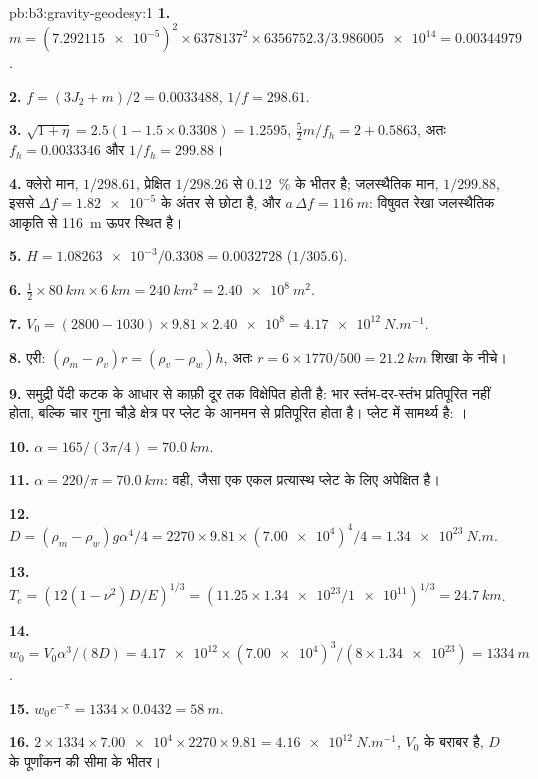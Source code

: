 \begin{solution}{pb:b3:gravity-geodesy:1}
\textbf{1.} $m = (\num{7.292115e-5})^2\times6378137^2\times6356752.3/
\num{3.986005e14} = \num{0.00344979}$.

\textbf{2.} $f = (3J_2 + m)/2 = \num{0.0033488}$, $1/f = 298.61$.

\textbf{3.} $\sqrt{1 + \eta} = 2.5(1 - 1.5\times0.3308) = 1.2595$,
$\tfrac52m/f_h = 2 + 0.5863$, अतः $f_h = \num{0.0033346}$ और $1/f_h = 299.88$।

\textbf{4.} क्लेरो मान, $1/298.61$, प्रेक्षित $1/298.26$ से
\qty{0.12}{\percent} के भीतर है; जलस्थैतिक मान, $1/299.88$, इससे
$\Delta f = \num{1.82e-5}$ के अंतर से छोटा है, और $a\,\Delta f = \qty{116}{m}$: विषुवत रेखा
जलस्थैतिक आकृति से \qty{116}{m} ऊपर स्थित है।

\textbf{5.} $H = \num{1.08263e-3}/0.3308 = \num{0.0032728}$ ($1/305.6$).

\textbf{6.} $\tfrac12\times\qty{80}{km}\times\qty{6}{km} = \qty{240}{km^2} =
\qty{2.40e8}{m^2}$.

\textbf{7.} $V_0 = (2800 - 1030)\times9.81\times\num{2.40e8} =
\qty{4.17e12}{N.m^{-1}}$.

\textbf{8.} एरी: $(\rho_m - \rho_v)r = (\rho_v - \rho_w)h$, अतः $r =
6\times1770/500 = \qty{21.2}{km}$ शिखा के नीचे।

\textbf{9.} समुद्री पेंदी कटक के आधार से काफ़ी दूर तक विक्षेपित होती है: भार
स्तंभ-दर-स्तंभ प्रतिपूरित नहीं होता, बल्कि चार गुना चौड़े क्षेत्र पर प्लेट के
आनमन से प्रतिपूरित होता है। प्लेट में सामर्थ्य है: ।

\textbf{10.} $\alpha = 165/(3\pi/4) = \qty{70.0}{km}$.

\textbf{11.} $\alpha = 220/\pi = \qty{70.0}{km}$: वही, जैसा एक एकल प्रत्यास्थ
प्लेट के लिए अपेक्षित है।

\textbf{12.} $D = (\rho_m - \rho_w)g\alpha^4/4 = 2270\times9.81\times(\num{7.00e4})^4/4
= \qty{1.34e23}{N.m}$.

\textbf{13.} $T_e = (12(1 - \nu^2)D/E)^{1/3} = (11.25\times\num{1.34e23}/
\num{1e11})^{1/3} = \qty{24.7}{km}$.

\textbf{14.} $w_0 = V_0\alpha^3/(8D) = \num{4.17e12}\times(\num{7.00e4})^3/
(8\times\num{1.34e23}) = \qty{1334}{m}$.

\textbf{15.} $w_0e^{-\pi} = 1334\times0.0432 = \qty{58}{m}$.

\textbf{16.} $2\times1334\times\num{7.00e4}\times2270\times9.81 =
\qty{4.16e12}{N.m^{-1}}$, $V_0$ के बराबर है, $D$ के पूर्णांकन की सीमा के भीतर।


\end{solution}
